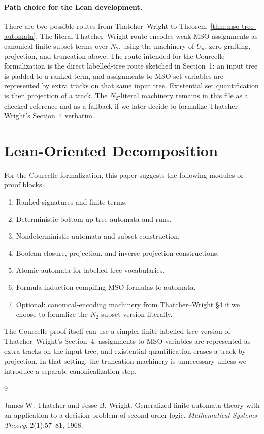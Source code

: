 \documentclass[11pt]{article}
\theoremstyle{definition}
\newcommand{\TW}{Thatcher--Wright}
\begin{document}
\paragraph{Path choice for the Lean development.}
There are two possible routes from \TW{} to
Theorem~\ref{thm:mso-tree-automata}.  The literal \TW{} route encodes weak MSO
assignments as canonical finite-subset terms over \(N_2\), using the machinery
of \(U_n\), zero grafting, projection, and truncation above.  The route intended
for the Courcelle formalization is the direct labelled-tree route sketched in
Section~1: an input tree is padded to a ranked term, and assignments to MSO set
variables are represented by extra tracks on that same input tree.  Existential
set quantification is then projection of a track.  The \(N_2\)-literal
machinery remains in this file as a checked reference and as a fallback if we
later decide to formalize \TW{}'s Section~4 verbatim.

\section{Lean-Oriented Decomposition}

For the Courcelle formalization, this paper suggests the following modules or
proof blocks.
\begin{enumerate}[leftmargin=*]
  \item Ranked signatures and finite terms.
  \item Deterministic bottom-up tree automata and runs.
  \item Nondeterministic automata and subset construction.
  \item Boolean closure, projection, and inverse projection constructions.
  \item Atomic automata for labelled tree vocabularies.
  \item Formula induction compiling MSO formulas to automata.
  \item Optional: canonical-encoding machinery from \TW{} \S4 if we choose to
    formalize the \(N_2\)-subset version literally.
\end{enumerate}

The Courcelle proof itself can use a simpler finite-labelled-tree version of
\TW{}'s Section~4: assignments to MSO variables are represented as extra tracks
on the input tree, and existential quantification erases a track by projection.
In that setting, the truncation machinery is unnecessary unless we introduce a
separate canonicalization step.

\begin{thebibliography}{9}

James W. Thatcher and Jesse B. Wright.
\newblock Generalized finite automata theory with an application to a decision
problem of second-order logic.
\newblock \emph{Mathematical Systems Theory}, 2(1):57--81, 1968.

\end{thebibliography}
\end{document}
